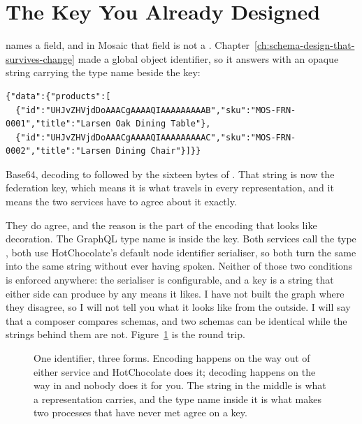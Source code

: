 \section{The Key You Already Designed}
\label{sec:ch08-the-key-you-already-designed}
%

 names a field, and in Mosaic that field is not a
. Chapter~\ref{ch:schema-design-that-survives-change} made
 a global object identifier, so it answers with an opaque
string carrying the type name beside the key:

\begin{verbatim}
{"data":{"products":[
  {"id":"UHJvZHVjdDoAAACgAAAAQIAAAAAAAAAB","sku":"MOS-FRN-0001","title":"Larsen Oak Dining Table"},
  {"id":"UHJvZHVjdDoAAACgAAAAQIAAAAAAAAAC","sku":"MOS-FRN-0002","title":"Larsen Dining Chair"}]}}
\end{verbatim}

Base64, decoding to  followed by the sixteen bytes of
. That string is now the federation
key, which means it is what travels in every representation, and it means the
two services have to agree about it exactly.

%
They do agree, and the reason is the part of the encoding that looks like
decoration. The GraphQL type name is inside the key. Both services call the type
, both use HotChocolate's default node identifier serialiser, so
both turn the same  into the same string without ever having spoken.
Neither of those two conditions is enforced anywhere: the serialiser is
configurable, and a key is a string that either side can produce by any means it
likes. I have not built the graph where they disagree, so I will not tell you
what it looks like from the outside. I will say that a composer compares
schemas, and two schemas can be identical while the strings behind them are not.
Figure~\ref{fig:ch08-key-round-trip} is the round trip.

\begin{figure}[htbp]
  \centering
  
  \caption{One identifier, three forms. Encoding happens on the way out of
  either service and HotChocolate does it; decoding happens on the way in and
  nobody does it for you. The string in the middle is what a representation
  carries, and the type name inside it is what makes two processes that have
  never met agree on a key.}
  \label{fig:ch08-key-round-trip}
\end{figure}

